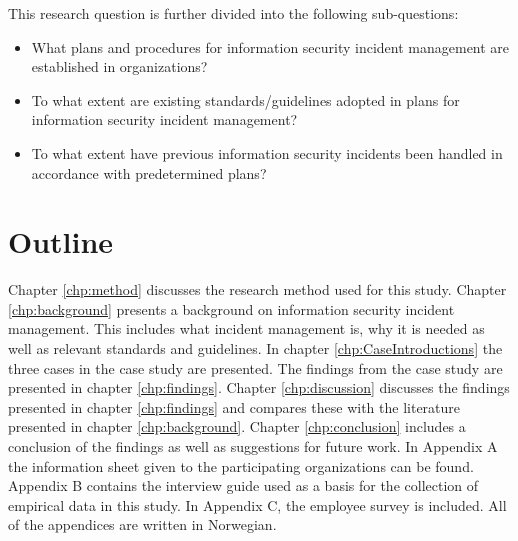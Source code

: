 This research question is further divided into the following sub-questions:

\begin{itemize}\itemsep-0.1cm
\item What plans and procedures for information security incident management are established in organizations?
\item To what extent are existing standards/guidelines adopted in plans for information security incident management?
\item To what extent have previous information security incidents been handled in accordance with predetermined plans? 
\end{itemize}

\section{Outline}
Chapter \ref{chp:method} discusses the research method used for this study.
Chapter \ref{chp:background} presents a background on information security incident management. This includes what incident management is, why it is needed as well as relevant standards and guidelines. In chapter \ref{chp:CaseIntroductions} the three cases in the case study are presented. The findings from the case study are presented in chapter \ref{chp:findings}. Chapter \ref{chp:discussion} discusses the findings presented in chapter \ref{chp:findings} and compares these with the literature presented in chapter \ref{chp:background}. Chapter \ref{chp:conclusion} includes a conclusion of the findings as well as suggestions for future work. In Appendix A the information sheet given to the participating organizations can be found. Appendix B contains the interview guide used as a basis for the collection of empirical data in this study. In Appendix C, the employee survey is included. All of the appendices are written in Norwegian.